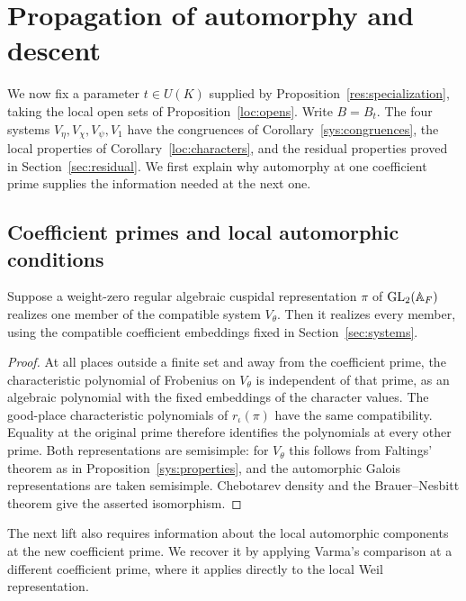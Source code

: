 \section{Propagation of automorphy and descent}\label{sec:automorphy}

We now fix a parameter $t\in U(K)$ supplied by
Proposition~\ref{res:specialization}, taking the local open sets of
Proposition~\ref{loc:opens}. Write $B=B_t$. The four systems
$V_\eta,V_\chi,V_\psi,V_1$ have the congruences of
Corollary~\ref{sys:congruences}, the local properties of
Corollary~\ref{loc:characters}, and the residual properties proved in
Section~\ref{sec:residual}. We first explain why automorphy at one
coefficient prime supplies the information needed at the next one.

\subsection{Coefficient primes and local automorphic conditions}

\begin{lemma}\label{aut:transport}
Suppose a weight-zero regular algebraic cuspidal representation $\pi$ of
$\operatorname{GL}_2(\mathbb A_F)$ realizes one member of the compatible system $V_\theta$.
Then it realizes every member, using the compatible coefficient embeddings
fixed in Section~\ref{sec:systems}.
\end{lemma}
\begin{proof}
At all places outside a finite set and away from the coefficient prime,
the characteristic polynomial of Frobenius on $V_\theta$ is independent
of that prime, as an algebraic polynomial with the fixed embeddings of the
character values. The good-place characteristic polynomials of
$r_\iota(\pi)$ have the same compatibility. Equality at the original prime
therefore identifies the polynomials at every other prime. Both
representations are semisimple: for $V_\theta$ this follows from Faltings'
theorem as in Proposition~\ref{sys:properties}, and the automorphic Galois
representations are taken semisimple. Chebotarev density and the
Brauer--Nesbitt theorem give the asserted isomorphism.
\end{proof}

The next lift also requires information about the local automorphic
components at the new coefficient prime. We recover it by applying
Varma's comparison at a different coefficient prime, where it applies
directly to the local Weil representation.


